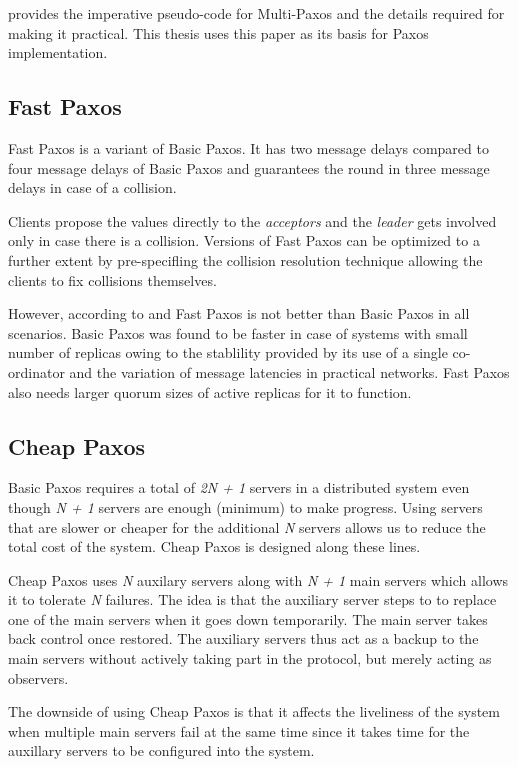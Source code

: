 \citet{Robbert2011} provides the imperative pseudo-code for Multi-Paxos and
the details required for making it practical. This thesis uses this paper as 
its basis for Paxos implementation.

\subsection{Fast Paxos}

Fast Paxos \citep{MSRTR2005112} is a variant of Basic Paxos. It has two
message delays compared to four message delays of Basic Paxos and guarantees
the round in three message delays in case of a collision.

Clients propose the values directly to the \emph{acceptors} and the 
\emph{leader} gets involved only in case there is a collision. Versions of Fast
Paxos can be optimized to a further extent by pre-specifling the collision
resolution technique allowing the clients to fix collisions themselves.

However, according to \citet{Vieira08theperformance} and \citet{Junqueira2007}
Fast Paxos is not better than Basic Paxos in all scenarios. Basic Paxos was 
found to be faster in case of systems with small number of replicas owing to 
the stablility provided by its use of a single co-ordinator and the variation
of message latencies in practical networks. Fast Paxos also needs larger quorum 
sizes of active replicas for it to function.

\subsection{Cheap Paxos}

Basic Paxos requires a total of \emph{2N + 1} servers in a distributed system 
even though \emph{N + 1} servers are enough (minimum) to make progress. 
Using servers that are slower or cheaper for the additional \emph{N} servers
allows us to reduce the total cost of the system. Cheap Paxos is designed along 
these lines.

Cheap Paxos uses \emph{N} auxilary servers along with \emph{N + 1} main servers
which allows it to tolerate \emph{N} failures. The idea is that the auxiliary
server steps to to replace one of the main servers when it goes down 
temporarily. The main server takes back control once restored. The auxiliary
servers thus act as a backup to the main servers without actively taking part
in the protocol, but merely acting as observers.

The downside of using Cheap Paxos is that it affects the liveliness of the 
system when multiple main servers fail at the same time since it takes time
for the auxillary servers to be configured into the system.


